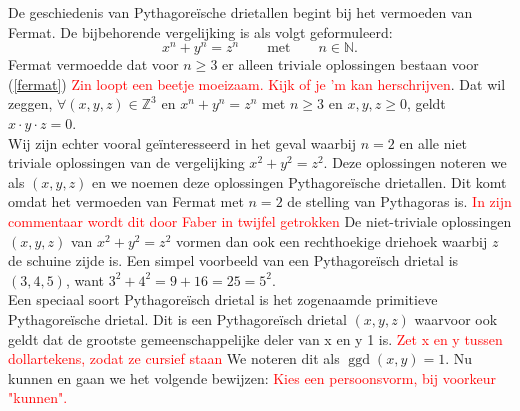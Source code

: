 \documentclass[12pt,reqno]{article}
\newcommand*{\NN}{\ensuremath{\mathbb{N}}}
\newcommand*{\ZZ}{\ensuremath{\mathbb{Z}}}
\theoremstyle{theorem}
\theoremstyle{definition}
\DeclareMathOperator{\ggd}{ggd}
\begin{document}
	De geschiedenis van Pythagore\"ische drietallen begint bij het vermoeden van Fermat. De bijbehorende vergelijking is als volgt geformuleerd:
	\begin{equation}\label{fermat}
		x^n + y^n = z^n \qquad \text{met} \qquad n \in \NN.
	\end{equation}
	Fermat vermoedde dat voor $n \geq 3$ er alleen triviale oplossingen bestaan voor (\ref{fermat}) \textcolor{red}{Zin loopt een beetje moeizaam. Kijk of je 'm kan herschrijven}. Dat wil zeggen, $\forall (x,y,z) \in \ZZ^3$ en $x^n + y^n = z^n$ met $n \geq 3$ en $x, y, z \geq 0$, geldt $x \cdot y \cdot z = 0$. \\
	Wij zijn echter vooral ge\"interesseerd in het geval waarbij $n=2$ en alle niet triviale oplossingen van de vergelijking $x^2 + y^2 = z^2$. Deze oplossingen noteren we als $(x,y,z)$ en we noemen deze oplossingen Pythagore\"ische drietallen. Dit komt omdat het vermoeden van Fermat met $n=2$ de stelling van Pythagoras is. \textcolor{red}{In zijn commentaar wordt dit door Faber in twijfel getrokken} De niet-triviale oplossingen $(x,y,z)$ van $x^2 + y^2 = z^2$ vormen dan ook een rechthoekige driehoek waarbij $z$ de schuine zijde is. Een simpel voorbeeld van een Pythagore\"isch drietal is $(3,4,5)$, want $3^2 + 4^2 = 9 + 16 = 25 = 5^2$. \\
	Een speciaal soort Pythagore\"isch drietal is het zogenaamde primitieve \mbox{Pythagore\"ische} drietal. Dit is een Pythagore\"isch drietal $(x,y,z)$ waarvoor ook geldt dat de grootste gemeenschappelijke deler van x en y 1 is. \textcolor{red}{Zet x en y tussen dollartekens, zodat ze cursief staan} We noteren dit als $\ggd(x,y) = 1$. Nu kunnen en gaan we het volgende bewijzen: \textcolor{red}{Kies een persoonsvorm, bij voorkeur "kunnen".}
	
\end{document}
